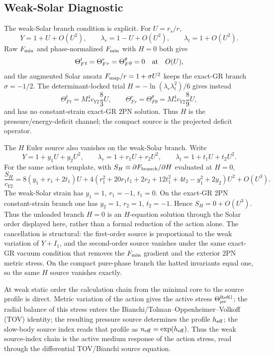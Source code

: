\documentclass[12pt,a4paper]{article}
\begin{document}
\subsection{Weak-Solar Diagnostic}

The weak-Solar branch condition is explicit. For $U=r_s/r$,
\[
Y=1+U+O(U^2),\qquad
\lambda_r=1-U+O(U^2),\qquad
\lambda_t=1+O(U^2).
\]
Raw $F_{\rm min}$ and phase-normalized $F_{\rm min}$ with $H=0$ both give
\[
\Theta_F^t{}_t=\Theta_F^r{}_r=\Theta_F^\theta{}_\theta=0
\quad {\rm at}\quad O(U),
\]
and the augmented Solar ansatz $F_{\rm map}/r=1+\sigma U^2$ keeps the
exact-GR branch $\sigma=-1/2$. The determinant-locked trial
$H=-\ln(\lambda_r\lambda_t^2)/6$ gives instead
\[
\Theta_F^t{}_t=M_*^4c_{Y2}\frac{8}{3}U,\qquad
\Theta_F^r{}_r=\Theta_F^\theta{}_\theta=M_*^4c_{Y2}\frac{8}{9}U,
\]
and has no constant-strain exact-GR $2$PN solution. Thus $H$ is the
pressure/energy-deficit channel; the compact source is the projected deficit
operator.

The $H$ Euler source also vanishes on the weak-Solar branch. Write
\[
Y=1+y_1U+y_2U^2,\qquad
\lambda_r=1+r_1U+r_2U^2,\qquad
\lambda_t=1+t_1U+t_2U^2.
\]
For the same action template, with
$S_H\equiv\partial F_{\rm branch}/\partial H$ evaluated at $H=0$,
\[
\frac{S_H}{c_{Y2}}
=8(y_1+r_1+2t_1)U
+4\left(r_1^2+20r_1t_1+2r_2+12t_1^2+4t_2-y_1^2+2y_2\right)U^2
+O(U^3).
\]
The weak-Solar strain has $y_1=1$, $r_1=-1$, $t_1=0$. On the exact-GR $2$PN
constant-strain branch one has $y_2=1$, $r_2=1$, $t_2=-1$. Hence
$S_H=0+O(U^3)$. Thus the unloaded branch $H=0$ is an $H$-equation solution
through the Solar order displayed here, rather than a formal reduction of the action alone.
The cancellation is structural: the first-order source is proportional to the
weak variation of $Y+I_1$, and the second-order source vanishes under the same
exact-GR vacuum condition that removes the $F_{\rm min}$ gradient and the
exterior $2$PN metric stress.
On the compact pure-phase branch the hatted invariants equal one, so the same
$H$ source vanishes exactly.

At weak static order the calculation chain from the minimal core to the source profile is direct. Metric variation of the action gives the active stress $\Theta^{\rm RefG}_{\mu\nu}$; the radial balance of this stress enters the Bianchi/Tolman--Oppenheimer--Volkoff (TOV) identity; the resulting pressure source determines the profile $h_{\rm eff}$; the slow-body source index reads that profile as $n_{\rm eff}=\exp(h_{\rm eff})$. Thus the weak source-index chain is the active medium response of the action stress, read through the differential TOV/Bianchi source equation.
\end{document}
